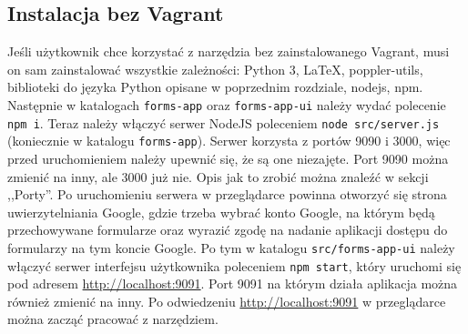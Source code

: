 \subsection{Instalacja bez Vagrant}
Jeśli użytkownik chce korzystać z narzędzia bez zainstalowanego Vagrant, musi on
sam zainstalować wszystkie zależności: Python 3, \LaTeX{}, poppler-utils, biblioteki
do języka Python opisane w poprzednim rozdziale, nodejs, npm. Następnie w katalogach
\texttt{forms-app} oraz \texttt{forms-app-ui} należy wydać polecenie \texttt{npm i}.
Teraz należy włączyć serwer NodeJS poleceniem \texttt{node src/server.js} 
(koniecznie w katalogu \texttt{forms-app}). Serwer korzysta z portów 9090 i 3000, 
więc przed uruchomieniem należy upewnić się, że są one niezajęte. Port 9090 można
zmienić na inny, ale 3000 już nie. Opis jak to zrobić można znaleźć w sekcji ,,Porty''.
Po uruchomieniu serwera w przeglądarce powinna otworzyć się
strona uwierzytelniania Google, gdzie trzeba wybrać konto Google, na którym
będą przechowywane formularze oraz wyrazić zgodę na nadanie aplikacji dostępu do
formularzy na tym koncie Google. Po tym w katalogu \texttt{src/forms-app-ui}
należy włączyć serwer interfejsu użytkownika poleceniem \texttt{npm start}, który
uruchomi się pod adresem \href{http://localhost:9091}{http://localhost:9091}.
Port 9091 na którym działa aplikacja można również zmienić na inny.
Po odwiedzeniu \href{http://localhost:9091}{http://localhost:9091} w przeglądarce
można zacząć pracować z narzędziem.


